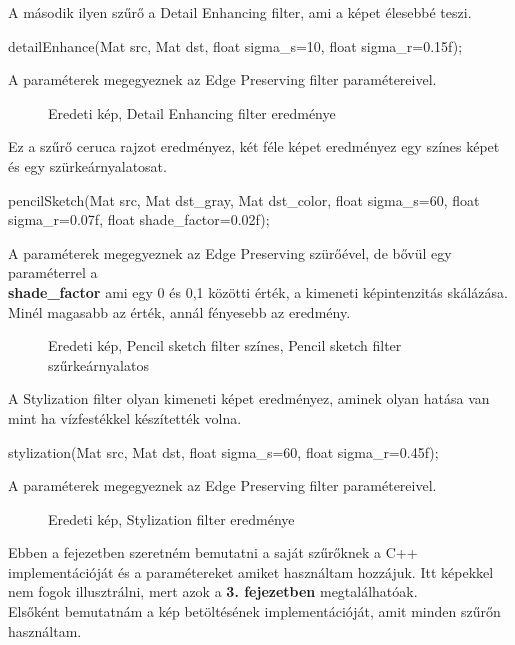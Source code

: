 \newpage
{}
A második ilyen szűrő a Detail Enhancing filter, ami a képet élesebbé teszi.
\begin{cpp}
detailEnhance(Mat src, Mat dst, float sigma_s=10, float sigma_r=0.15f);
\end{cpp}
A paraméterek megegyeznek az Edge Preserving filter paramétereivel. 
 \begin{figure}[ht]
\centering
{}
\caption{Eredeti kép, Detail Enhancing filter eredménye} 
\label{fig:detailEnhance}
\end{figure}
Ez a szűrő ceruca rajzot eredményez, két féle képet eredményez egy színes képet és egy szürkeárnyalatosat.
\begin{cpp}
pencilSketch(Mat src, Mat dst_gray, Mat dst_color, float sigma_s=60, 
		float sigma_r=0.07f, float shade_factor=0.02f);
\end{cpp}
A paraméterek megegyeznek az Edge Preserving szürőével, de bővül egy paraméterrel a\\
\indent \textbf{shade\_factor}  ami egy 0 és 0,1 közötti érték, a kimeneti képintenzitás skálázása. Minél magasabb az érték, annál fényesebb az eredmény.
\begin{figure}[ht]
\centering
{}
\caption{Eredeti kép, Pencil sketch filter színes, Pencil sketch filter szűrkeárnyalatos} 
\label{fig: pencil_sketch_color_grey}
\end{figure}
A Stylization filter olyan kimeneti képet eredményez, aminek olyan hatása van mint ha vízfestékkel készítették volna.
\begin{cpp}
stylization(Mat src, Mat dst, float sigma_s=60, float sigma_r=0.45f);
\end{cpp}
A paraméterek megegyeznek az Edge Preserving filter paramétereivel. 
 \begin{figure}[ht]
\centering
{}
\caption{Eredeti kép, Stylization filter eredménye} 
\label{fig: stylization}
\end{figure}
Ebben a fejezetben szeretném bemutatni a saját szűrőknek a C++ implementációját és a paramétereket amiket használtam hozzájuk. Itt képekkel nem fogok illusztrálni, mert azok a \textbf{3. fejezetben} megtalálhatóak. \\ Elsőként bemutatnám a kép betöltésének implementációját, amit minden szűrőn használtam.
